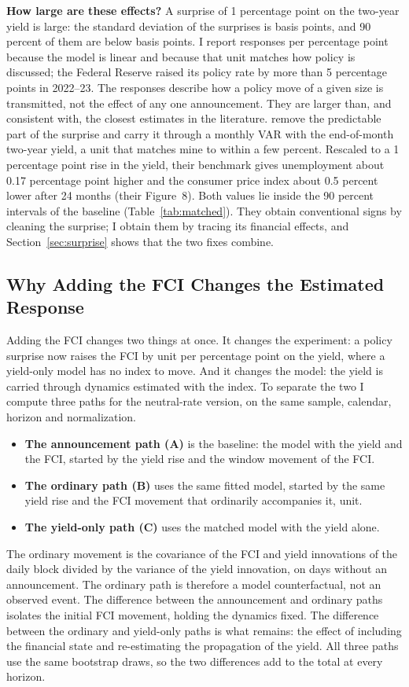 \documentclass[11pt]{article}
\begin{document}
\textbf{How large are these effects?} A surprise of 1 percentage point on the two-year yield is large: the standard deviation of the surprises is  basis points, and 90 percent of them are below  basis points. I report responses per percentage point because the model is linear and because that unit matches how policy is discussed; the Federal Reserve raised its policy rate by more than 5 percentage points in 2022--23. The responses describe how a policy move of a given size is transmitted, not the effect of any one announcement. They are larger than, and consistent with, the closest estimates in the literature. \citet{bauer2023} remove the predictable part of the surprise and carry it through a monthly VAR with the end-of-month two-year yield, a unit that matches mine to within a few percent. Rescaled to a 1 percentage point rise in the yield, their benchmark gives unemployment about 0.17 percentage point higher and the consumer price index about 0.5 percent lower after 24 months (their Figure~8). Both values lie inside the 90 percent intervals of the baseline (Table~\ref{tab:matched}). They obtain conventional signs by cleaning the surprise; I obtain them by tracing its financial effects, and Section~\ref{sec:surprise} shows that the two fixes combine.

\subsection{Why Adding the FCI Changes the Estimated Response}\label{sec:decomp}
Adding the FCI changes two things at once. It changes the experiment: a policy surprise now raises the FCI by  unit per percentage point on the yield, where a yield-only model has no index to move. And it changes the model: the yield is carried through dynamics estimated with the index. To separate the two I compute three paths for the neutral-rate version, on the same sample, calendar, horizon and normalization.
\begin{itemize}\setlength\itemsep{0pt}
\item \textbf{The announcement path (A)} is the baseline: the model with the yield and the FCI, started by the yield rise and the window movement of the FCI.
\item \textbf{The ordinary path (B)} uses the same fitted model, started by the same yield rise and the FCI movement that ordinarily accompanies it,  unit.
\item \textbf{The yield-only path (C)} uses the matched model with the yield alone.
\end{itemize}
The ordinary movement is the covariance of the FCI and yield innovations of the daily block divided by the variance of the yield innovation, on days without an announcement. The ordinary path is therefore a model counterfactual, not an observed event. The difference between the announcement and ordinary paths isolates the initial FCI movement, holding the dynamics fixed. The difference between the ordinary and yield-only paths is what remains: the effect of including the financial state and re-estimating the propagation of the yield. All three paths use the same bootstrap draws, so the two differences add to the total at every horizon.
\end{document}
